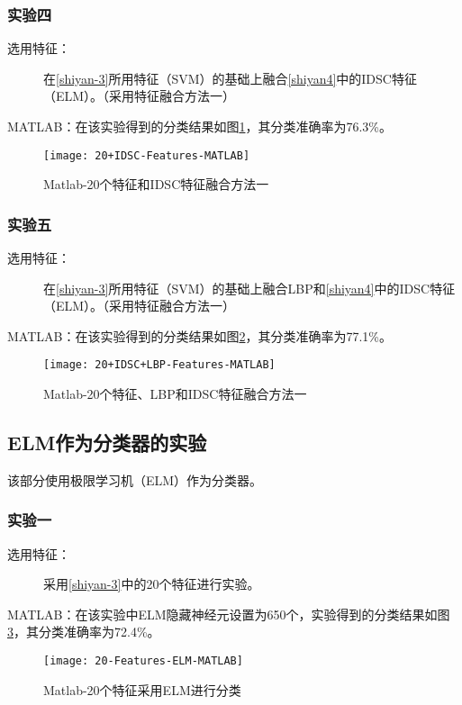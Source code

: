 \subsubsection{实验四}
\begin{description}
\item[选用特征：] 在\ref{shiyan-3}所用特征（SVM）的基础上融合\ref{shiyan4}中的IDSC特征（ELM）。（采用特征融合方法一）
\end{description}
MATLAB：在该实验得到的分类结果如图\ref{fig:20+IDSC-Features-MATLAB}，其分类准确率为76.3\%。
\begin{figure}[!ht]
\centering
\texttt{[image: 20+IDSC-Features-MATLAB]}
\caption{Matlab-20个特征和IDSC特征融合方法一}
\label{fig:20+IDSC-Features-MATLAB}
\end{figure}

\subsubsection{实验五}
\begin{description}
\item[选用特征：] 在\ref{shiyan-3}所用特征（SVM）的基础上融合LBP和\ref{shiyan4}中的IDSC特征（ELM）。（采用特征融合方法一）
\end{description}
MATLAB：在该实验得到的分类结果如图\ref{fig:20+IDSC+LBP-Features-MATLAB}，其分类准确率为77.1\%。
\begin{figure}[!ht]
\centering
\texttt{[image: 20+IDSC+LBP-Features-MATLAB]}
\caption{Matlab-20个特征、LBP和IDSC特征融合方法一}
\label{fig:20+IDSC+LBP-Features-MATLAB}
\end{figure}


\subsection{ELM作为分类器的实验}
该部分使用极限学习机（ELM）作为分类器。

\subsubsection{实验一}
\begin{description}
\item[选用特征：] 采用\ref{shiyan-3}中的20个特征进行实验。
\end{description}
MATLAB：在该实验中ELM隐藏神经元设置为650个，实验得到的分类结果如图\ref{fig:20-Features-ELM-MATLAB}，其分类准确率为72.4\%。
\begin{figure}[!ht]
\centering
\texttt{[image: 20-Features-ELM-MATLAB]}
\caption{Matlab-20个特征采用ELM进行分类}
\label{fig:20-Features-ELM-MATLAB}
\end{figure}


